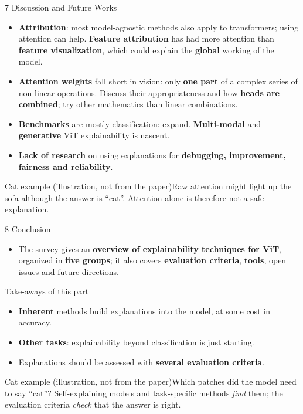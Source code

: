 \documentclass[10pt]{beamer}
\newcommand{\highlight}[1]{\textcolor{myNewColorA}{\textbf{#1}}}
\newcommand{\catex}[1]{\begin{exampleblock}{\footnotesize Cat example (illustration, not from the paper)}\footnotesize #1\end{exampleblock}}
\begin{document}
\begin{frame}{7 Discussion and Future Works}
\footnotesize
\begin{itemize}
\item \highlight{Attribution}: most model-agnostic methods also apply to transformers; using attention can help. \textbf{Feature attribution} has had more attention than \textbf{feature visualization}, which could explain the \textbf{global} working of the model.
\item \highlight{Attention weights} fall short in vision: only \textbf{one part} of a complex series of non-linear operations. Discuss their appropriateness and how \textbf{heads are combined}; try other mathematics than linear combinations.
\item \highlight{Benchmarks} are mostly classification: expand. \textbf{Multi-modal} and \textbf{generative} ViT explainability is nascent.
\item \highlight{Lack of research} on using explanations for \textbf{debugging, improvement, fairness and reliability}.
\end{itemize}
\vspace{0.2em}
\catex{Raw attention might light up the sofa although the answer is ``cat''. Attention alone is therefore not a safe explanation.}
\end{frame}

\begin{frame}{8 Conclusion}
\begin{itemize}
\item The survey gives an \textbf{overview of explainability techniques for ViT}, organized in \textbf{five groups}; it also covers \textbf{evaluation criteria}, \textbf{tools}, open issues and future directions.
\end{itemize}
\begin{block}{Take-aways of this part}
\begin{itemize}
\item \textbf{Inherent} methods build explanations into the model, at some cost in accuracy.
\item \textbf{Other tasks}: explainability beyond classification is just starting.
\item Explanations should be assessed with \textbf{several evaluation criteria}.
\end{itemize}
\end{block}
\catex{Which patches did the model need to say ``cat''? Self-explaining models and task-specific methods \emph{find} them; the evaluation criteria \emph{check} that the answer is right.}
\end{frame}
\end{document}
